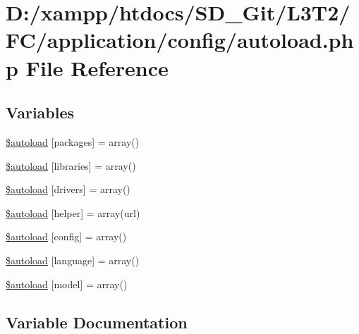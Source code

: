 \hypertarget{autoload_8php}{}\section{D\+:/xampp/htdocs/\+S\+D\+\_\+\+Git/\+L3\+T2/\+F\+C/application/config/autoload.php File Reference}
\label{autoload_8php}
\subsection*{Variables}
\begin{DoxyCompactItemize}
\item 
\hyperlink{autoload_8php_ab562c5bbb18f14d6b6b7014d9166625d}{\$autoload} \mbox{[}\textquotesingle{}packages\textquotesingle{}\mbox{]} = array()
\item 
\hyperlink{autoload_8php_ab86d0a1a62e12b528eacaa7100bc4d93}{\$autoload} \mbox{[}\textquotesingle{}libraries\textquotesingle{}\mbox{]} = array()
\item 
\hyperlink{autoload_8php_ab5159fd0a997ccee7145f373cdab896f}{\$autoload} \mbox{[}\textquotesingle{}drivers\textquotesingle{}\mbox{]} = array()
\item 
\hyperlink{autoload_8php_aa98014ce8ad854ad9500e65ff159272d}{\$autoload} \mbox{[}\textquotesingle{}helper\textquotesingle{}\mbox{]} = array(\textquotesingle{}url\textquotesingle{})
\item 
\hyperlink{autoload_8php_ac051887e192979c0320e05821bad8f33}{\$autoload} \mbox{[}\textquotesingle{}config\textquotesingle{}\mbox{]} = array()
\item 
\hyperlink{autoload_8php_addfee4f4b38a8235172cb173995a9c0b}{\$autoload} \mbox{[}\textquotesingle{}language\textquotesingle{}\mbox{]} = array()
\item 
\hyperlink{autoload_8php_a942b884082b1defda7fb10ee71bba324}{\$autoload} \mbox{[}\textquotesingle{}model\textquotesingle{}\mbox{]} = array()
\end{DoxyCompactItemize}


\subsection{Variable Documentation}
\hypertarget{autoload_8php_ab562c5bbb18f14d6b6b7014d9166625d}{}
